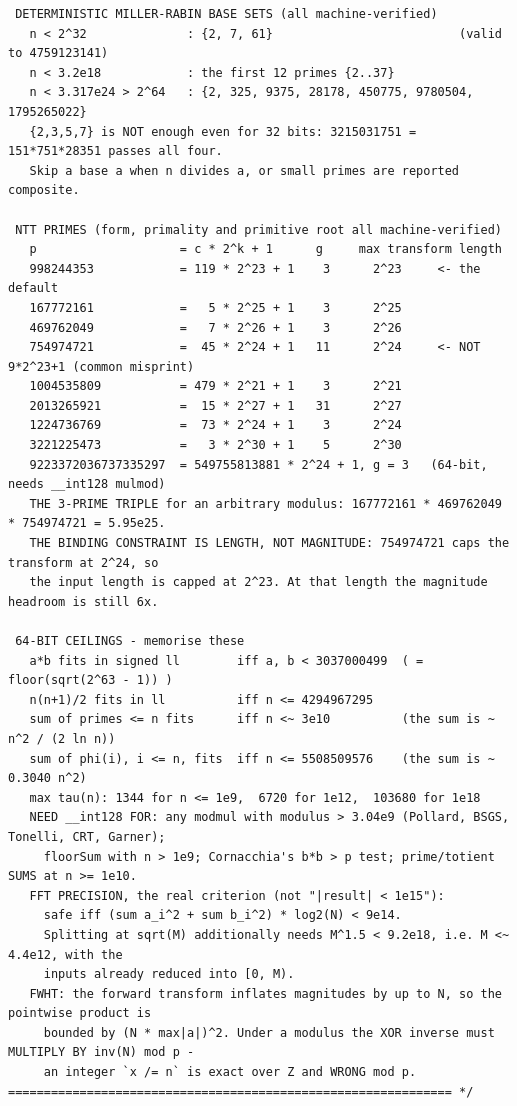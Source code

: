 \documentclass[9pt,a4paper,twocolumn]{extarticle}
\begin{document}
\begin{lstlisting}
 DETERMINISTIC MILLER-RABIN BASE SETS (all machine-verified)
   n < 2^32              : {2, 7, 61}                          (valid to 4759123141)
   n < 3.2e18            : the first 12 primes {2..37}
   n < 3.317e24 > 2^64   : {2, 325, 9375, 28178, 450775, 9780504, 1795265022}
   {2,3,5,7} is NOT enough even for 32 bits: 3215031751 = 151*751*28351 passes all four.
   Skip a base a when n divides a, or small primes are reported composite.

 NTT PRIMES (form, primality and primitive root all machine-verified)
   p                    = c * 2^k + 1      g     max transform length
   998244353            = 119 * 2^23 + 1    3      2^23     <- the default
   167772161            =   5 * 2^25 + 1    3      2^25
   469762049            =   7 * 2^26 + 1    3      2^26
   754974721            =  45 * 2^24 + 1   11      2^24     <- NOT 9*2^23+1 (common misprint)
   1004535809           = 479 * 2^21 + 1    3      2^21
   2013265921           =  15 * 2^27 + 1   31      2^27
   1224736769           =  73 * 2^24 + 1    3      2^24
   3221225473           =   3 * 2^30 + 1    5      2^30
   9223372036737335297  = 549755813881 * 2^24 + 1, g = 3   (64-bit, needs __int128 mulmod)
   THE 3-PRIME TRIPLE for an arbitrary modulus: 167772161 * 469762049 * 754974721 = 5.95e25.
   THE BINDING CONSTRAINT IS LENGTH, NOT MAGNITUDE: 754974721 caps the transform at 2^24, so
   the input length is capped at 2^23. At that length the magnitude headroom is still 6x.

 64-BIT CEILINGS - memorise these
   a*b fits in signed ll        iff a, b < 3037000499  ( = floor(sqrt(2^63 - 1)) )
   n(n+1)/2 fits in ll          iff n <= 4294967295
   sum of primes <= n fits      iff n <~ 3e10          (the sum is ~ n^2 / (2 ln n))
   sum of phi(i), i <= n, fits  iff n <= 5508509576    (the sum is ~ 0.3040 n^2)
   max tau(n): 1344 for n <= 1e9,  6720 for 1e12,  103680 for 1e18
   NEED __int128 FOR: any modmul with modulus > 3.04e9 (Pollard, BSGS, Tonelli, CRT, Garner);
     floorSum with n > 1e9; Cornacchia's b*b > p test; prime/totient SUMS at n >= 1e10.
   FFT PRECISION, the real criterion (not "|result| < 1e15"):
     safe iff (sum a_i^2 + sum b_i^2) * log2(N) < 9e14.
     Splitting at sqrt(M) additionally needs M^1.5 < 9.2e18, i.e. M <~ 4.4e12, with the
     inputs already reduced into [0, M).
   FWHT: the forward transform inflates magnitudes by up to N, so the pointwise product is
     bounded by (N * max|a|)^2. Under a modulus the XOR inverse must MULTIPLY BY inv(N) mod p -
     an integer `x /= n` is exact over Z and WRONG mod p.
============================================================== */
\end{lstlisting}
\end{document}
